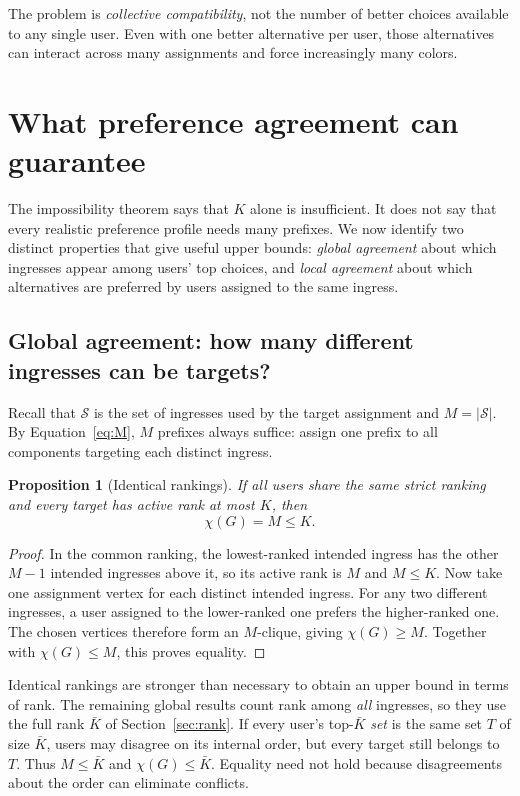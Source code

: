 \documentclass[10pt,a4paper]{article}
\newtheorem{proposition}[theorem]{Proposition}
\newcommand{\Sset}{\mathcal S}
\begin{document}
The problem is \emph{collective compatibility}, not the number of better choices available to any single user. Even with one better alternative per user, those alternatives can interact across many assignments and force increasingly many colors.

\section{What preference agreement can guarantee}
\label{sec:agreement}

The impossibility theorem says that $K$ alone is insufficient. It does not say that every realistic preference profile needs many prefixes. We now identify two distinct properties that give useful upper bounds: \emph{global agreement} about which ingresses appear among users' top choices, and \emph{local agreement} about which alternatives are preferred by users assigned to the same ingress.

\subsection{Global agreement: how many different ingresses can be targets?}

Recall that $\Sset$ is the set of ingresses used by the target assignment and $M=|\Sset|$. By Equation~\eqref{eq:M}, $M$ prefixes always suffice: assign one prefix to all components targeting each distinct ingress.

\begin{proposition}[Identical rankings]\label{prop:identical}
If all users share the same strict ranking and every target has active rank at most $K$, then
\[
\chi(G)=M\le K.
\]
\end{proposition}
\begin{proof}
In the common ranking, the lowest-ranked intended ingress has the other $M-1$ intended ingresses above it, so its active rank is $M$ and $M\le K$. Now take one assignment vertex for each distinct intended ingress. For any two different ingresses, a user assigned to the lower-ranked one prefers the higher-ranked one. The chosen vertices therefore form an $M$-clique, giving $\chi(G)\ge M$. Together with $\chi(G)\le M$, this proves equality.
\end{proof}

Identical rankings are stronger than necessary to obtain an upper bound in terms of rank. The remaining global results count rank among \emph{all} ingresses, so they use the full rank $\bar K$ of Section~\ref{sec:rank}. If every user's top-$\bar K$ \emph{set} is the same set $T$ of size $\bar K$, users may disagree on its internal order, but every target still belongs to $T$. Thus $M\le \bar K$ and $\chi(G)\le \bar K$. Equality need not hold because disagreements about the order can eliminate conflicts.
\end{document}
